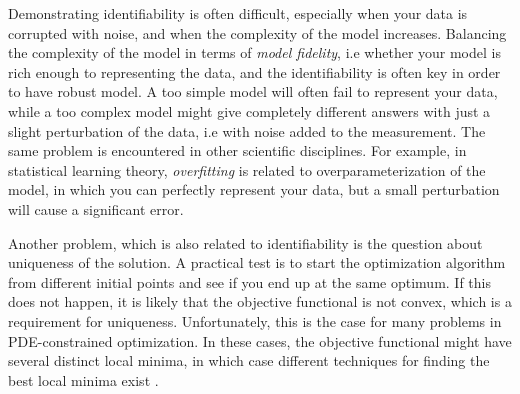 Demonstrating identifiability is 
often difficult, especially when your data is corrupted with noise,
and when the complexity of the model increases. Balancing the
complexity of the model in terms of \emph{model fidelity}, i.e whether
your 
model is rich enough to representing the data, and the identifiability
is often key in order to have robust model. A too simple model will
often fail to represent your data, while a too complex model might
give completely different answers with just a slight perturbation of
the data, i.e with noise added to the measurement. The same problem is
encountered in other scientific disciplines. For example, in
statistical learning theory, \emph{overfitting} is related to
overparameterization of the model, in which you can perfectly
represent your data, but a small perturbation will cause a significant
error.

Another problem, which is also related to identifiability is
the question about uniqueness of the solution. A practical test is to
start the optimization algorithm from different initial points and see
if you end up at the same optimum. If this does not happen, it is
likely that the objective functional is not convex, which is a
requirement for uniqueness. Unfortunately, this is the case for many
problems in PDE-constrained optimization. In these cases, the objective
functional might have several distinct local minima, in which case
different techniques for finding the best local minima exist
\cite{farrell2015multiple}. 










